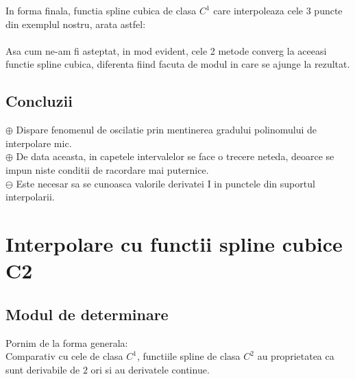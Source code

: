\documentclass{article}
\begin{document}
In forma finala, functia spline cubica de clasa $C^1$ care interpoleaza cele 3 puncte din exemplul nostru, arata astfel:\\

\\

Asa cum ne-am fi asteptat, in mod evident, cele 2 metode converg la aceeasi functie spline cubica, diferenta fiind facuta de modul in care se ajunge la rezultat.

\subsection{Concluzii}

\tab
$\oplus$ Dispare fenomenul de oscilatie prin mentinerea gradului polinomului de interpolare mic.\\

$\oplus$ De data aceasta, in capetele intervalelor se face o trecere neteda, deoarce se impun niste conditii de racordare mai puternice.\\

$\ominus$ Este necesar sa se cunoasca valorile derivatei I in punctele din suportul interpolarii. \\

\section{Interpolare cu functii spline cubice C2}
\label{sec:spline_c2}

\subsection{Modul de determinare}
\tab Pornim de la forma generala: \\

Comparativ cu cele de clasa $C^1$, functiile spline de clasa $C^2$ au proprietatea ca sunt derivabile de $2$ ori si au derivatele continue.
\end{document}
